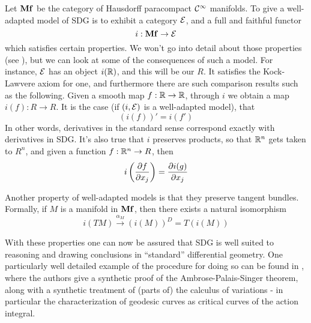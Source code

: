 Let \( \mathbf{Mf} \) be the category of Hausdorff paracompact \( \mathcal{C}^\infty \) manifolds. To give a well-adapted model of SDG is to exhibit a category \( \mathcal{E} \), and a full and faithful functor
\begin{equation*}
  i:\mathbf{Mf}\to\mathcal{E}
\end{equation*}
which satisfies certain properties. We won't go into detail about those properties (see \cite{kock06}), but we can look at some of the consequences of such a model. For instance, \( \mathcal{E} \) has an object \( i(\mathbb{R}) \), and this will be our \( R \). It satisfies the Kock-Lawvere axiom for one, and furthermore there are such comparison results such as the following. Given a smooth map \( f:\mathbb{R}\to\mathbb{R} \), through \( i \) we obtain a map \( i(f):R\to R \). It is the case (if \( (i,\mathcal{E}) \) is a well-adapted model), that
\begin{equation*}
  (i(f))' = i(f')
\end{equation*}
In other words, derivatives in the standard sense correspond exactly with derivatives in SDG. It's also true that \( i \) preserves products, so that \( \mathbb{R}^n \) gets taken to \( R^n \), and given a function \( f:\mathbb{R}^n\to R \), then
\begin{equation*}
  i\left( \frac{\partial f}{\partial x_j} \right) = \frac{\partial i(g)}{\partial x_j}
\end{equation*}

Another property of well-adapted models is that they preserve tangent bundles. Formally, if \( M \) is a manifold in \( \mathbf{Mf} \), then there exists a natural isomorphism
\begin{equation*}
  i(TM)\stackrel{\alpha_M}{\to} (i(M))^D = T(i(M))
\end{equation*}

With these properties one can now be assured that SDG is well suited to reasoning and drawing conclusions in ``standard'' differential geometry. One particularly well detailed example of the procedure for doing so can be found in \cite{bun17}, where the authors give a synthetic proof of the Ambrose-Palais-Singer theorem, along with a synthetic treatment of (parts of) the calculus of variations - in particular the characterization of geodesic curves as critical curves of the action integral.
